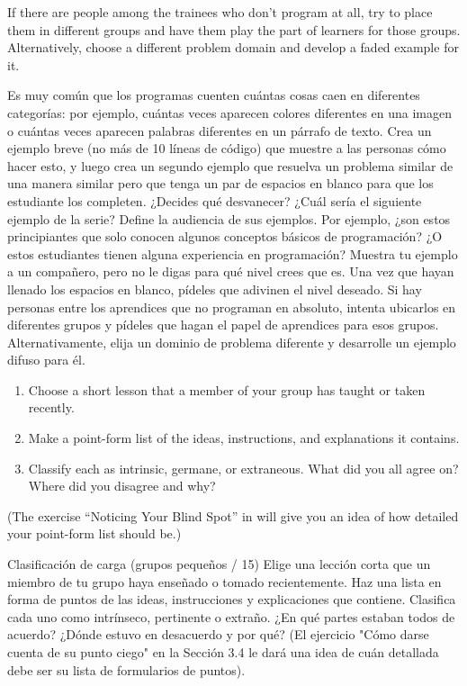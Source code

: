 If there are people among the trainees who don't program at all,
try to place them in different groups
and have them play the part of learners for those groups.
Alternatively,
choose a different problem domain and develop a faded example for it.

Es muy común que los programas cuenten cuántas cosas caen en diferentes categorías: por ejemplo, cuántas veces aparecen colores diferentes en una imagen o cuántas veces aparecen palabras diferentes en un párrafo de texto.
Crea un ejemplo breve (no más de 10 líneas de código) que muestre a las personas cómo hacer esto, y luego crea un segundo ejemplo que resuelva un problema similar de una manera similar pero que tenga un par de espacios en blanco para que los estudiante los completen. ¿Decides qué desvanecer? ¿Cuál sería el siguiente ejemplo de la serie?
Define la audiencia de sus ejemplos. Por ejemplo, ¿son estos principiantes que solo conocen algunos conceptos básicos de programación? ¿O estos estudiantes tienen alguna experiencia en programación?
Muestra tu ejemplo a un compañero, pero no le digas para qué nivel crees que es. Una vez que hayan llenado los espacios en blanco, pídeles que adivinen el nivel deseado.
Si hay personas entre los aprendices que no programan en absoluto, intenta ubicarlos en diferentes grupos y pídeles que hagan el papel de aprendices para esos grupos. Alternativamente, elija un dominio de problema diferente y desarrolle un ejemplo difuso para él.



\begin{enumerate}

\item
  Choose a short lesson that a member of your group has taught or taken recently.

\item
  Make a point-form list of the ideas, instructions, and explanations it contains.

\item
  Classify each as intrinsic, germane, or extraneous.
  What did you all agree on?
  Where did you disagree and why?

\end{enumerate}

(The exercise ``Noticing Your Blind Spot'' in 
will give you an idea of how detailed your point-form list should be.)

Clasificación de carga (grupos pequeños / 15)
Elige una lección corta que un miembro de tu grupo haya enseñado o tomado recientemente.
Haz una lista en forma de puntos de las ideas, instrucciones y explicaciones que contiene.
Clasifica cada uno como intrínseco, pertinente o extraño. ¿En qué partes estaban todos de acuerdo? ¿Dónde estuvo en desacuerdo y por qué?
(El ejercicio "Cómo darse cuenta de su punto ciego" en la Sección  3.4 le dará una idea de cuán detallada debe ser su lista de formularios de puntos).


